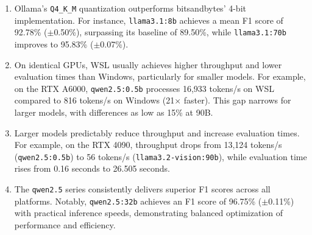 \documentclass[conference]{IEEEtran}
\begin{document}
\begin{enumerate}
    \item Ollama's \texttt{Q4\_K\_M} quantization outperforms bitsandbytes' 4-bit implementation. For instance, \texttt{llama3.1:8b} achieves a mean F1 score of 92.78\% ($\pm$0.50\%), surpassing its baseline of 89.50\%, while \texttt{llama3.1:70b} improves to 95.83\% ($\pm$0.07\%).

    \item On identical GPUs, WSL usually achieves higher throughput and lower evaluation times than Windows, particularly for smaller models. For example, on the RTX A6000, \texttt{qwen2.5:0.5b} processes 16,933 tokens/s on WSL compared to 816 tokens/s on Windows (21× faster). This gap narrows for larger models, with differences as low as 15\% at 90B. 

    \item Larger models predictably reduce throughput and increase evaluation times. For example, on the RTX 4090, throughput drops from 13,124 tokens/s (\texttt{qwen2.5:0.5b}) to 56 tokens/s (\texttt{llama3.2-vision:90b}), while evaluation time rises from 0.16 seconds to 26.505 seconds.

    \item The \texttt{qwen2.5} series consistently delivers superior F1 scores across all platforms. Notably, \texttt{qwen2.5:32b} achieves an F1 score of 96.75\% ($\pm$0.11\%) with practical inference speeds, demonstrating balanced optimization of performance and efficiency.
\end{enumerate}
\end{document}
